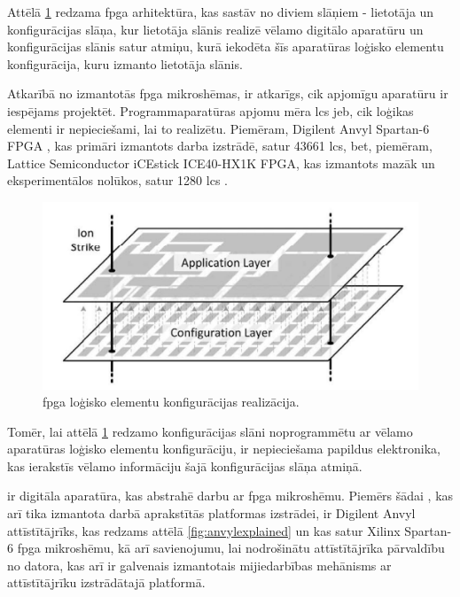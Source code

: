 Attēlā \ref{fig:fpgalayers} redzama \gls{fpga} arhitektūra, kas sastāv no diviem
slāņiem - lietotāja un konfigurācijas slāņa, kur lietotāja slānis realizē vēlamo
digitālo aparatūru un konfigurācijas slānis satur atmiņu, kurā iekodēta šīs
aparatūras loģisko elementu konfigurācija, kuru izmanto lietotāja slānis.
\cite[para. II]{HerreraAlzu2013}

Atkarībā no izmantotās \gls{fpga} mikroshēmas, ir atkarīgs, cik apjomīgu
aparatūru ir iespējams projektēt. Programmaparatūras apjomu mēra \gls{lcs} jeb,
cik loģikas elementi ir nepieciešami, lai to realizētu. Piemēram, Digilent Anvyl
Spartan-6 FPGA \cite{XilinxSpartan6}, kas primāri izmantots darba izstrādē, satur 43661 \gls{lcs},
bet, piemēram, Lattice Semiconductor iCEstick ICE40-HX1K FPGA, kas izmantots mazāk un
eksperimentālos nolūkos, satur 1280 \gls{lcs} \cite{iCE40}.

\begin{figure}[H]
    \includegraphics[width=0.5\linewidth]{assets/a-c-layers.png}
    \centering
    \caption{\gls{fpga} loģisko elementu konfigurācijas realizācija.
    \cite[para. II]{HerreraAlzu2013}}
    \label{fig:fpgalayers}
\end{figure}

Tomēr, lai attēlā \ref{fig:fpgalayers} redzamo konfigurācijas slāni
noprogrammētu ar vēlamo aparatūras loģisko elementu konfigurāciju, ir
nepieciešama papildus elektronika, kas ierakstīs vēlamo informāciju šajā
konfigurācijas slāņa atmiņā.

 ir digitāla aparatūra, kas
abstrahē darbu ar \gls{fpga} mikroshēmu. Piemērs šādai
, kas arī tika izmantota darbā aprakstītās platformas
izstrādei, ir Digilent Anvyl attīstītājrīks, kas redzams attēlā
\ref{fig:anvylexplained} un kas satur Xilinx Spartan-6 \gls{fpga} mikroshēmu, kā
arī  savienojumu, lai nodrošinātu attīstītājrīka
pārvaldību no datora, kas arī ir galvenais izmantotais mijiedarbības mehānisms
ar attīstītājrīku izstrādātajā platformā.

